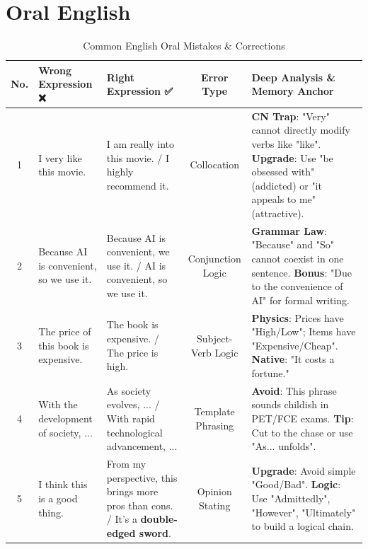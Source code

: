 \section{Oral English}

\begin{table}[h]
\centering
\caption{Common English Oral Mistakes \& Corrections}
\label{tab:oral_mistakes}
\begin{tabular}{|c|p{4cm}|p{4cm}|c|p{4cm}|}
\hline
\textbf{No.} & \textbf{Wrong Expression ❌} & \textbf{Right Expression ✅} & \textbf{Error Type} & \textbf{Deep Analysis \& Memory Anchor} \\ \hline
1 & I very like this movie. & I am really into this movie. / I highly recommend it. & Collocation & \textbf{CN Trap}: "Very" cannot directly modify verbs like "like". \newline \textbf{Upgrade}: Use "be obsessed with" (addicted) or "it appeals to me" (attractive). \\ \hline
2 & Because AI is convenient, so we use it. & Because AI is convenient, we use it. / AI is convenient, so we use it. & Conjunction Logic & \textbf{Grammar Law}: "Because" and "So" cannot coexist in one sentence. \newline \textbf{Bonus}: "Due to the convenience of AI" for formal writing. \\ \hline
3 & The price of this book is expensive. & The book is expensive. / The price is high. & Subject-Verb Logic & \textbf{Physics}: Prices have "High/Low"; Items have "Expensive/Cheap". \newline \textbf{Native}: "It costs a fortune." \\ \hline
4 & With the development of society, ... & As society evolves, ... / With rapid technological advancement, ... & Template Phrasing & \textbf{Avoid}: This phrase sounds childish in PET/FCE exams. \newline \textbf{Tip}: Cut to the chase or use "As... unfolds". \\ \hline
5 & I think this is a good thing. & From my perspective, this brings more pros than cons. / It’s a \textbf{double-edged sword}. & Opinion Stating & \textbf{Upgrade}: Avoid simple "Good/Bad". \newline \textbf{Logic}: Use "Admittedly", "However", "Ultimately" to build a logical chain. \\ \hline
\end{tabular}
\end{table}
